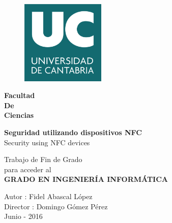 \documentclass[a4paper,12pt, twoside, openright,makeidx]{book}
\title{\titulo}
\author{\autor}
\newcommand{\titulo}{Seguridad utilizando dispositivos NFC}
\newcommand{\tituloIngles}{Security using NFC devices}
\newcommand{\autor}{Fidel Abascal López}
\newcommand{\director}{Domingo Gómez Pérez}
\newcommand{\carrera}{GRADO EN INGENIERÍA INFORMÁTICA}
\newcommand{\fecha}{Junio - 2016}
\begin{document}
\begin{titlepage}

\begin{center}
\vspace*{-1in}
\begin{figure}[htb]
\begin{center}
\includegraphics[width=4cm]{./img/unicanLogo}
\end{center}
\end{figure}

\begin{LARGE}
\textbf{
Facultad \\
De\\
Ciencias\\}
\end{LARGE}
\vspace*{1in}
\begin{huge}
\textbf{\titulo} \\
\tituloIngles \\
\end{huge}
\vspace*{0.6in}
\begin{large}
Trabajo de Fin de Grado\\
para acceder al\\
\vspace*{0.15in}
\textbf{\carrera}\\
\end{large}
\vspace*{0.8in}

\begin{large}
\begin{flushright}
Autor : \autor\\
Director : \director\\
\fecha
\end{flushright}
\end{large}

\end{center}

\end{titlepage}
\tableofcontents{}
\end{document}
